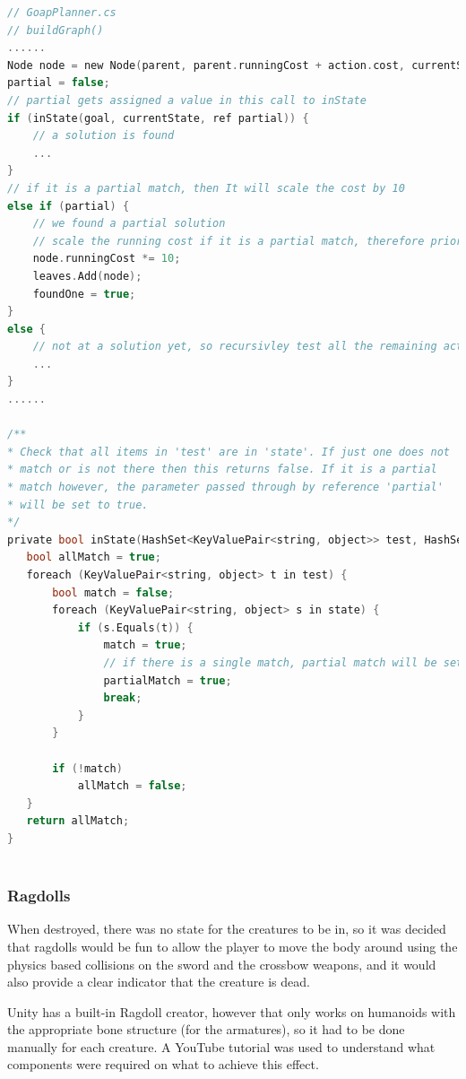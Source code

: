 \documentclass[12pt]{report}
\begin{document}
\begin{lstlisting}[language=c]
// GoapPlanner.cs
// buildGraph()
......
Node node = new Node(parent, parent.runningCost + action.cost, currentState, action);
partial = false;
// partial gets assigned a value in this call to inState
if (inState(goal, currentState, ref partial)) {
    // a solution is found   
    ...
}
// if it is a partial match, then It will scale the cost by 10
else if (partial) {
    // we found a partial solution
    // scale the running cost if it is a partial match, therefore prioritising full matches
    node.runningCost *= 10; 
    leaves.Add(node);
    foundOne = true;
}
else {
    // not at a solution yet, so recursivley test all the remaining actions and branch out the tree
    ...
}
......

/**
* Check that all items in 'test' are in 'state'. If just one does not
* match or is not there then this returns false. If it is a partial
* match however, the parameter passed through by reference 'partial'
* will be set to true.
*/
private bool inState(HashSet<KeyValuePair<string, object>> test, HashSet<KeyValuePair<string, object>> state, ref bool partialMatch) {
   bool allMatch = true;
   foreach (KeyValuePair<string, object> t in test) {
       bool match = false;
       foreach (KeyValuePair<string, object> s in state) {
           if (s.Equals(t)) {
               match = true;
               // if there is a single match, partial match will be set to true
               partialMatch = true;
               break;
           }
       }

       if (!match)
           allMatch = false;
   }
   return allMatch;
}



\end{lstlisting}

\subsubsection{Ragdolls}
When destroyed, there was no state for the creatures to be in, so it was decided that ragdolls would be fun to allow the player to move the body around using the physics based collisions on the sword and the crossbow weapons, and it would also provide a clear indicator that the creature is dead.

Unity has a built-in Ragdoll creator, however that only works on humanoids with the appropriate bone structure (for the armatures), so it had to be done manually for each creature. A YouTube tutorial was used to understand what components were required on what to achieve this effect. \cite{RagdollTutorial}
\end{document}

